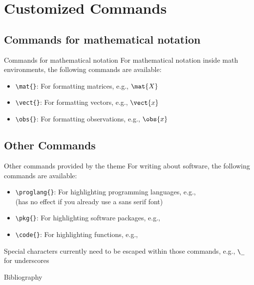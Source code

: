 \documentclass[pdfpagelabels=false, usepdftitle=false, aspectratio=169]{beamer}
\begin{document}
\section{Customized Commands}
\subsection{Commands for mathematical notation}
\begin{frame}[fragile]{Commands for mathematical notation}
For mathematical notation inside math environments, the following commands are
available:

\bigskip
\begin{itemize}
  \item \verb+\mat{}+: For formatting matrices, e.g., $\mat{X}$
  \medskip
  \item \verb+\vect{}+: For formatting vectors, e.g., $\vect{x}$
  \medskip
  \item \verb+\obs{}+: For formatting observations, e.g., $\obs{x}$
\end{itemize}
\end{frame}



\subsection{Other Commands}
\begin{frame}[fragile]{Other commands provided by the theme}
For writing about software, the following commands are available:
\begin{itemize}
  \item \verb+\proglang{}+: For highlighting programming languages, e.g.,
   \\
  \smallskip
  {\small (has no effect if you already use a sans serif font)}
  \medskip
  \item \verb+\pkg{}+: For highlighting software packages, e.g., 
  \medskip
  \item \verb+\code{}+: For highlighting functions, e.g.,
\end{itemize}

\vfill

\begin{itemize}
  \arrowitem Special characters currently need to be escaped within those
  commands, e.g., \verb+\_+ for underscores
\end{itemize}
\end{frame}



\begin{frame}{Bibliography}
\tiny 


\end{frame}
\end{document}
